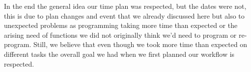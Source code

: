 \documentclass{cce2014-design}
\begin{document}
In the end the general idea our time plan was respected, but the dates were
not, this is due to plan changes and event that we already discussed here but
also to unexpected problems as programming taking more time than expected or the
arising need of functions we did not originally think we'd need to program or
re-program. Still, we believe that even though we took more time than expected
on different tasks the overall goal we had when we first planned our workflow is
respected.



\end{document}
